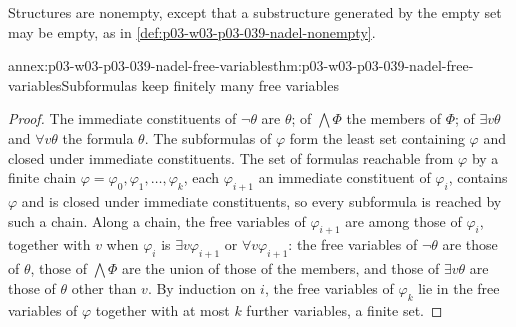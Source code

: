 Structures are nonempty, except that a substructure generated by the empty
set may be empty, as in \cref{def:p03-w03-p03-039-nadel-nonempty}.

\begin{annexitem}{annex:p03-w03-p03-039-nadel-free-variables}{thm:p03-w03-p03-039-nadel-free-variables}{Subformulas keep finitely many free variables}
\begin{proof}
The immediate constituents of \(\neg\theta\) are \(\theta\); of
\(\bigwedge\Phi\) the members of \(\Phi\); of \(\exists v\theta\) and
\(\forall v\theta\) the formula \(\theta\). The subformulas of \(\varphi\)
form the least set containing \(\varphi\) and closed under immediate
constituents. The set of formulas reachable from \(\varphi\) by a finite
chain \(\varphi=\varphi_0,\varphi_1,\dots,\varphi_k\), each \(\varphi_{i+1}\)
an immediate constituent of \(\varphi_i\), contains \(\varphi\) and is closed
under immediate constituents, so every subformula is reached by such a
chain. Along a chain, the free variables of \(\varphi_{i+1}\) are among those
of \(\varphi_i\), together with \(v\) when \(\varphi_i\) is
\(\exists v\varphi_{i+1}\) or \(\forall v\varphi_{i+1}\): the free variables
of \(\neg\theta\) are those of \(\theta\), those of \(\bigwedge\Phi\) are the
union of those of the members, and those of \(\exists v\theta\) are those of
\(\theta\) other than \(v\). By induction on \(i\), the free variables of
\(\varphi_k\) lie in the free variables of \(\varphi\) together with at most
\(k\) further variables, a finite set.
\end{proof}
\end{annexitem}


